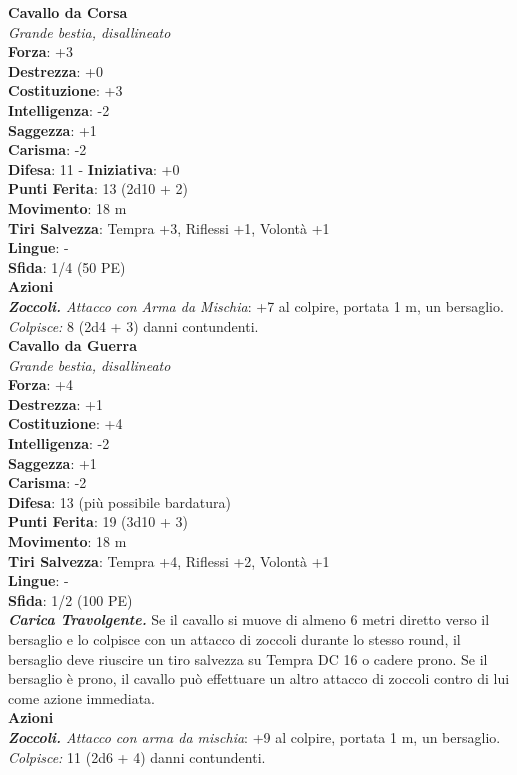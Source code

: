 \begin{multicols}{2}
\medskip\textbf{Cavallo da Corsa}\\
\emph{Grande bestia, disallineato}\\
\textbf{Forza}: +3\\
\textbf{Destrezza}: +0\\
\textbf{Costituzione}: +3\\
\textbf{Intelligenza}: -2\\
\textbf{Saggezza}: +1\\
\textbf{Carisma}: -2\\
\textbf{Difesa}: 11 - \textbf{Iniziativa}: +0\\
\textbf{Punti Ferita}: 13 (2d10 + 2)\\
\textbf{Movimento}: 18 m\\
\textbf{Tiri Salvezza}: Tempra +3, Riflessi +1, Volontà +1 \\
\textbf{Lingue}: -\\
\textbf{Sfida}: 1/4 (50 PE)\smallskip\\
\smallskip\textbf{Azioni}\\
\emph{\textbf{Zoccoli.} Attacco con Arma da Mischia}: +7 al colpire, portata 1 m, un bersaglio.\\
\emph{Colpisce:} 8 (2d4 + 3) danni contundenti.\\

\medskip\textbf{Cavallo da Guerra}\\
\emph{Grande bestia, disallineato}\\
\textbf{Forza}: +4\\
\textbf{Destrezza}: +1\\
\textbf{Costituzione}: +4\\
\textbf{Intelligenza}: -2\\
\textbf{Saggezza}: +1\\
\textbf{Carisma}: -2\\
\textbf{Difesa}: 13 (più possibile bardatura)\\
\textbf{Punti Ferita}: 19 (3d10 + 3)\\
\textbf{Movimento}: 18 m\\
\textbf{Tiri Salvezza}:  Tempra +4, Riflessi +2, Volontà +1 \\
\textbf{Lingue}: -\\
\textbf{Sfida}: 1/2 (100 PE)\smallskip\\
\emph{\textbf{Carica Travolgente.}} Se il cavallo si muove di almeno 6 metri diretto verso il bersaglio e lo colpisce con un attacco di zoccoli durante lo stesso round, il bersaglio deve riuscire un tiro salvezza su Tempra DC  16 o cadere prono. Se il bersaglio è prono, il cavallo può effettuare un altro attacco di zoccoli contro di lui come azione immediata. \\
\smallskip\textbf{Azioni}\\
\emph{\textbf{Zoccoli.} Attacco con arma da mischia}: +9 al colpire, portata 1 m, un bersaglio.\\
\emph{Colpisce:} 11 (2d6 + 4) danni contundenti.\\


\end{multicols}
